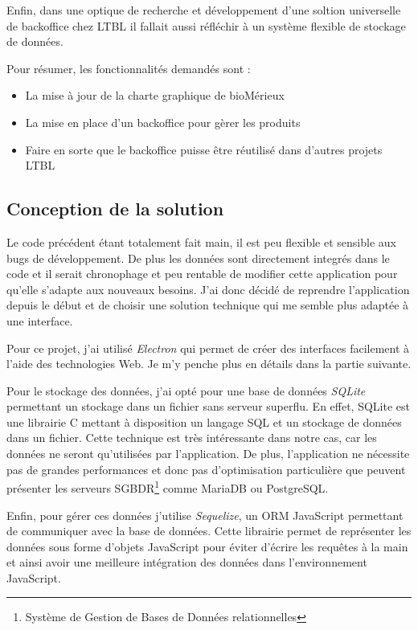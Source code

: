 Enfin, dans une optique de recherche et développement d'une soltion universelle de backoffice chez LTBL il fallait aussi réfléchir à un système flexible de stockage de données.

Pour résumer, les fonctionnalités demandés sont :

\begin{itemize}
    \item La mise à jour de la charte graphique de bioMérieux
    \item La mise en place d'un backoffice pour gèrer les produits
    \item Faire en sorte que le backoffice puisse être réutilisé dans d'autres projets LTBL
\end{itemize}


\subsection{Conception de la solution}

Le code précédent étant totalement fait main, il est peu flexible et sensible aux bugs de développement.
De plus les données sont directement integrés dans le code et il serait chronophage et peu rentable de modifier cette application pour qu'elle s'adapte aux nouveaux besoins.
J'ai donc décidé de reprendre l'application depuis le début et de choisir une solution technique qui me semble plus adaptée à une interface.

Pour ce projet, j'ai utilisé \emph{Electron} qui permet de créer des interfaces facilement à l'aide des technologies Web.
Je m'y penche plus en détails dans la partie suivante.

Pour le stockage des données, j'ai opté pour une base de données \emph{SQLite} permettant un stockage dans un fichier sans serveur superflu.
En effet, SQLite est une librairie C mettant à disposition un langage SQL et un stockage de données dans un fichier.
Cette technique est très intéressante dans notre cas, car les données ne seront qu'utilisées par l'application.
De plus, l'application ne nécessite pas de grandes performances et donc pas d'optimisation particulière que peuvent présenter les serveurs SGBDR\footnote{Système de Gestion de Bases de Données relationnelles} comme MariaDB ou PostgreSQL\@.

Enfin, pour gérer ces données j'utilise \emph{Sequelize}, un ORM JavaScript permettant de communiquer avec la base de données.
Cette librairie permet de représenter les données sous forme d'objets JavaScript pour éviter d'écrire les requêtes à la main et ainsi avoir une meilleure intégration des données dans l'environnement JavaScript.


